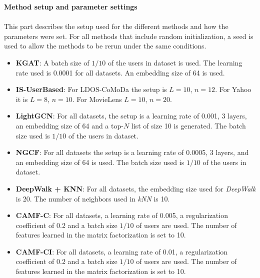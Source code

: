 \textbf{Method setup and parameter settings}
\\\\
This part describes the setup used for the different methods and how the parameters were set.
For all methods that include random initialization, a seed is used to allow the methods to be rerun under the same conditions.
\begin{itemize}
    \item \textbf{KGAT}: A batch size of $1/10$ of the users in dataset is used. The learning rate used is 0.0001 for all datasets. An embedding size of 64 is used.
    \item \textbf{IS-UserBased}: For LDOS-CoMoDa the setup is $L=10$, $n=12$. For Yahoo it is $L=8$, $n=10$. For MovieLens $L=10$, $n=20$.
    \item \textbf{LightGCN}: For all datasets, the setup is a learning rate of 0.001, 3 layers, an embedding size of 64 and a top-$N$ list of size 10 is generated. The batch size used is $1/10$ of the users in dataset.
    \item \textbf{NGCF}: For all datasets the setup is a learning rate of 0.0005, 3 layers, and an embedding size of 64 is used. The batch size used is $1/10$ of the users in dataset.
    \item \textbf{DeepWalk + KNN}: For all datasets, the embedding size used for \textit{DeepWalk} is 20. The number of neighbors used in \textit{kNN} is 10.
    \item \textbf{CAMF-C}: For all datasets, a learning rate of 0.005, a regularization coefficient of 0.2 and a batch size $1/10$ of users are used. The number of features learned in the matrix factorization is set to 10.
    \item \textbf{CAMF-CI}: For all datasets, a learning rate of 0.01, a regularization coefficient of 0.2 and a batch size $1/10$ of users are used. The number of features learned in the matrix factorization is set to 10.
\end{itemize}
